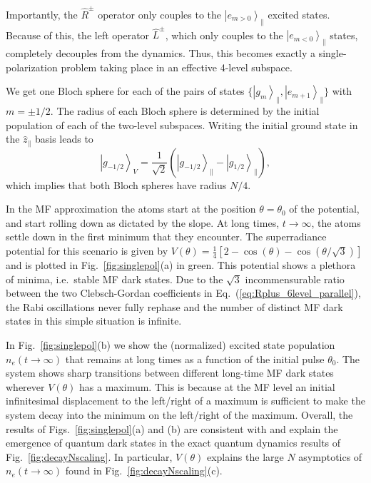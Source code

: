 \documentclass[aps,prx,superscriptaddress,twocolumn,notitlepage,nofootinbib,longbibliography]{revtex4-2}
\newcommand{\ket}[1]{\left|#1\right>}
\newcommand{\quv}{\hat{z}}
\begin{document}
Importantly, the $\hat{R}^\pm$ operator only couples to the $\ket{e_{m>0}}_\parallel$ excited states.
Because of this, the left operator $\hat{L}^\pm$, which only couples to the $\ket{e_{m<0}}_\parallel$ states, completely decouples from the dynamics. Thus, this becomes exactly a single-polarization problem taking place in an effective 4-level subspace.

We get one Bloch sphere for each of the pairs of states $\{ \ket{g_m}_\parallel, \ket{e_{m+1}}_\parallel \}$ with $m=\pm1/2$.
The radius of each Bloch sphere is determined by the initial population of each of the two-level subspaces. Writing the initial ground state in the $\quv_\parallel$ basis leads to
\begin{equation}
	\ket{g_{-1/2}}_V=\frac{1}{\sqrt{2}} \left( \ket{g_{-1/2}}_\parallel - \ket{g_{1/2}}_\parallel \right),
\label{eq:IC6l_parallel}
\end{equation}
which implies that both Bloch spheres have radius $N/4$.

In the  MF approximation
the atoms start at the position $\theta=\theta_0$ of the potential, and start rolling down as dictated by the slope. At long times, $t\rightarrow\infty$, the atoms settle down in the first minimum that they encounter.
The superradiance potential for this scenario is given by $V(\theta)= \frac{1}{4} [2 - \cos(\theta) - \cos(\theta/\sqrt{3})]$ and is plotted in Fig.~\ref{fig:singlepol}(a) in green.
This potential shows a plethora of minima, i.e.~stable MF dark states. Due to the $\sqrt{3}$ incommensurable ratio between the two Clebsch-Gordan coefficients in Eq.~(\ref{eq:Rplus_6level_parallel}), the Rabi oscillations never fully rephase and the number of distinct MF dark states in this simple situation is infinite.


In Fig.~\ref{fig:singlepol}(b) we show the (normalized) excited state population $n_e(t\rightarrow\infty)$ that remains at long times as a function of the initial pulse $\theta_0$.
The system shows sharp transitions between different long-time MF dark states wherever $V(\theta)$ has a maximum.
This is because at the MF level an initial infinitesimal displacement to the left/right of a maximum is sufficient to make the system decay into the minimum on the left/right of the maximum.
Overall, the results of Figs.~\ref{fig:singlepol}(a) and (b) are consistent with and explain the emergence of quantum dark states in the exact quantum dynamics results of Fig.~\ref{fig:decayNscaling}. In particular, $V(\theta)$ explains the large $N$ asymptotics of $n_e(t\rightarrow\infty)$ found in Fig.~\ref{fig:decayNscaling}(c).
\end{document}
